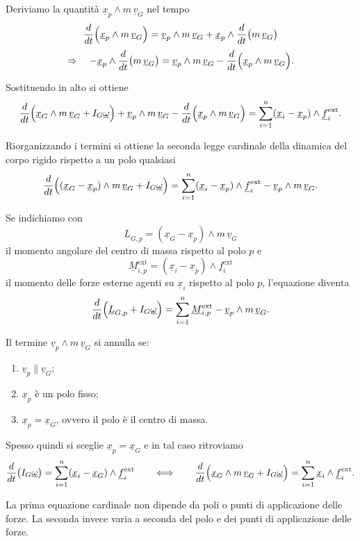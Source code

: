 Deriviamo la quantità \(\underline{x}_p\wedge m\,\underline{v}_G\) nel tempo
\[
\frac{d}{dt}\Bigl(\underline{x}_p\wedge m\,\underline{v}_G\Bigr)
=
\underline{v}_p\wedge m\,\underline{v}_G
+
\underline{x}_p\wedge \frac{d}{dt}\bigl(m\,\underline{v}_G\bigr)
\]
\[
\Rightarrow\quad
-
\underline{x}_p\wedge \frac{d}{dt}\bigl(m\,\underline{v}_G\bigr)
=
\underline{v}_p\wedge m\,\underline{v}_G
-
\frac{d}{dt}\Bigl(\underline{x}_p\wedge m\,\underline{v}_G\Bigr).
\]

Sostituendo in alto si ottiene
\[
\frac{d}{dt}\Bigl(\underline{x}_G\wedge m\,\underline{v}_G+I_G\underline{\omega}\Bigr)
+
\underline{v}_p\wedge m\,\underline{v}_G
-
\frac{d}{dt}\Bigl(\underline{x}_p\wedge m\,\underline{v}_G\Bigr)
=
\sum_{i=1}^n (\underline{x}_i-\underline{x}_p)\wedge \underline{f}_i^{\mathrm{ext}}.
\]

Riorganizzando i termini si ottiene la seconda legge cardinale della dinamica
del corpo rigido rispetto a un polo qualsiasi
\[
\frac{d}{dt}\Bigl((\underline{x}_G-\underline{x}_p)\wedge m\,\underline{v}_G
+
I_G\underline{\omega}\Bigr)
=
\sum_{i=1}^n (\underline{x}_i-\underline{x}_p)\wedge \underline{f}_i^{\mathrm{ext}}
-
\underline{v}_p\wedge m\,\underline{v}_G.
\]

Se indichiamo con
\[
\underline{L}_{G,p}=(\underline{x}_G-\underline{x}_p)\wedge m\,\underline{v}_G
\]
il momento angolare del centro di massa rispetto al polo \(p\) e
\[
\underline{M}_{i,p}^{\mathrm{ext}}=(\underline{x}_i-\underline{x}_p)\wedge \underline{f}_i^{\mathrm{ext}}
\]
il momento delle forze esterne agenti su \(\underline{x}_i\) rispetto al polo \(p\),
l'equazione diventa
\[
\frac{d}{dt}\Bigl(\underline{L}_{G,p}+I_G\underline{\omega}\Bigr)
=
\sum_{i=1}^n \underline{M}_{i,p}^{\mathrm{ext}}
-
\underline{v}_p\wedge m\,\underline{v}_G.
\]


\begin{oss}{}
Il termine \(\underline{v}_p \wedge m\,\underline{v}_G\) si annulla se:
\begin{enumerate}[label=\roman*)]
    \item \(\underline{v}_p \parallel \underline{v}_G\);
    \item \(\underline{x}_p\) è un polo fisso;
    \item \(\underline{x}_p=\underline{x}_G\), ovvero il polo è il centro di massa.
\end{enumerate}

Spesso quindi si sceglie \(\underline{x}_p=\underline{x}_G\) e in tal caso ritroviamo
\[
\frac{d}{dt}\bigl(I_G\underline{\omega}\bigr)
=
\sum_{i=1}^{n} (\underline{x}_i-\underline{x}_G)\wedge \underline{f}_i^{\mathrm{ext}}
\qquad \Longleftrightarrow \qquad
\frac{d}{dt}\Bigl(\underline{x}_G\wedge m\,\underline{v}_G+I_G\underline{\omega}\Bigr)
=
\sum_{i=1}^{n} \underline{x}_i\wedge \underline{f}_i^{\mathrm{ext}}.
\]

\medskip

La prima equazione cardinale non dipende da poli o punti di applicazione
delle forze. La seconda invece varia a seconda del polo e dei punti di
applicazione delle forze.
\end{oss}

